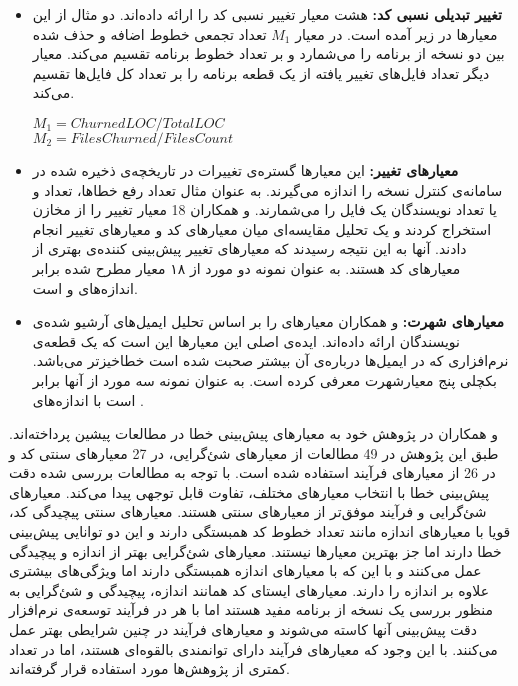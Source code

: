 \begin{itemize}
\item \textbf{تغییر تبدیلی نسبی کد: }
 هشت معیار تغییر  نسبی کد را ارائه داده‌اند\cite{nagappan2005use}. دو مثال از این معیارها در زیر آمده است.  در معیار $M_1 $ تعداد تجمعی خطوط اضافه و حذف شده بین دو نسخه از برنامه را می‌شمارد و بر تعداد خطوط برنامه تقسیم می‌کند. معیار دیگر تعداد فایل‌های تغییر یافته از یک قطعه برنامه را بر تعداد  کل فایل‌ها تقسیم می‌کند. 
\begin{latin}
$M_1 = Churned LOC / Total LOC$\\
$M_2 = Files Churned / Files Count$
\end{latin}

\item \textbf{معیارهای تغییر: }
این معیارها  گستره‌ی تغییرات در تاریخچه‌ی ذخیره شده در سامانه‌ی کنترل نسخه را اندازه می‌گیرند. به عنوان مثال تعداد رفع خطاها، تعداد  و یا تعداد نویسندگان یک فایل را می‌شمارند.  و همکاران 18 معیار تغییر را از مخازن  استخراج کردند و یک تحلیل مقایسه‌ای میان معیارهای کد و معیارهای تغییر انجام دادند. آنها به این نتیجه رسیدند که معیارهای تغییر پیش‌بینی کننده‌ی بهتری از معیارهای کد هستند.  به عنوان نمونه دو مورد از ۱۸ معیار مطرح شده برابر اندازه‌های  و  است.

\item \textbf{معیارهای شهرت: }
  و همکاران معیارهای  را بر اساس تحلیل ایمیل‌های آرشیو شده‌ی نویسندگان ارائه داده‌اند. ایده‌ی اصلی این معیارها این است که یک قطعه‌ی  نرم‌افزاری که در ایمیل‌ها درباره‌ی آن بیشتر صحبت شده است خطاخیزتر می‌باشد\cite{bacchelli2010popular}.  بکچلی پنج معیارشهرت معرفی کرده است.  به عنوان نمونه سه مورد از آنها  برابر است با اندازه‌های . \\
\end{itemize}


 و همکاران در پژوهش خود به  معیارهای پیش‌بینی خطا در مطالعات پیشین پرداخته‌اند.  طبق این پژوهش در 49\lr{\%} مطالعات از معیارهای شئ‌گرایی، در 27\lr{\%} معیارهای سنتی کد و در 26 \lr{\%} از معیارهای فرآیند استفاده شده است. با توجه به مطالعات بررسی شده دقت پیش‌بینی خطا  با انتخاب معیارهای مختلف، تفاوت قابل توجهی  پیدا می‌کند. معیارهای شئ‌گرایی و فرآیند موفق‌تر از معیارهای سنتی هستند. معیارهای سنتی  پیچیدگی کد، قویا با معیارهای اندازه مانند تعداد خطوط کد همبستگی دارند و این دو توانایی پیش‌بینی خطا دارند اما جز بهترین معیارها نیستند. معیارهای شئ‌گرایی بهتر از اندازه و پیچیدگی عمل می‌کنند و با این که با معیارهای اندازه همبستگی دارند اما ویژگی‌های بیشتری علاوه بر اندازه را دارند. معیارهای ایستای کد همانند اندازه، پیچیدگی و شئ‌گرایی به منظور بررسی یک نسخه از برنامه مفید هستند اما با هر  در فرآیند توسعه‌ی نرم‌افزار دقت پیش‌بینی آنها کاسته می‌شوند و معیارهای فرآیند در چنین شرایطی بهتر عمل می‌کنند.  با این وجود  که  معیارهای فرآیند‌  دارای توانمندی بالقوه‌ای  هستند، اما در تعداد کمتری از پژوهش‌ها مورد استفاده قرار گرفته‌اند\cite{radjenovic2013software}. \\
 
